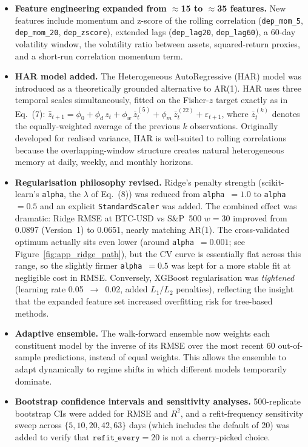\begin{itemize}
    \item \textbf{Feature engineering expanded from $\approx$15 to $\approx$35 features.}
          New features include momentum and z-score of the rolling correlation
          (\texttt{dep\_mom\_5}, \texttt{dep\_mom\_20}, \texttt{dep\_zscore}),
          extended lags (\texttt{dep\_lag20}, \texttt{dep\_lag60}), a 60-day volatility
          window, the volatility ratio between assets, squared-return proxies, and a
          short-run correlation momentum term.
    \item \textbf{HAR model added.}
          The Heterogeneous AutoRegressive (HAR) model
          \cite{corsi2009har}
          was introduced as a theoretically grounded alternative to AR(1).
          HAR uses three temporal scales simultaneously, fitted on the Fisher-$z$
          target exactly as in Eq.~(7):
          $\hat{z}_{t+1} = \phi_0 + \phi_d\,z_t + \phi_w\,\bar{z}^{(5)}_t + \phi_m\,\bar{z}^{(22)}_t + \varepsilon_{t+1}$,
          where $\bar{z}^{(k)}_t$ denotes the equally-weighted average of the previous
          $k$ observations.
          Originally developed for realised variance, HAR is well-suited to rolling
          correlations because the overlapping-window structure creates natural
          heterogeneous memory at daily, weekly, and monthly horizons.
    \item \textbf{Regularisation philosophy revised.}
          Ridge's penalty strength (scikit-learn's \texttt{alpha}, the $\lambda$ of
          Eq.~(8)) was reduced from \texttt{alpha}~$= 1.0$ to \texttt{alpha}~$= 0.5$
          and an explicit \texttt{StandardScaler} was added.
          The combined effect was dramatic: Ridge RMSE at BTC-USD vs S\&P~500 $w = 30$
          improved from 0.0897 (Version~1) to 0.0651, nearly matching AR(1).
          The cross-validated optimum actually sits even lower (around
          \texttt{alpha}~$= 0.001$; see Figure~\ref{fig:app_ridge_path}), but the CV
          curve is essentially flat across this range, so the slightly firmer
          \texttt{alpha}~$= 0.5$ was kept for a more stable fit at negligible cost in RMSE.
          Conversely, XGBoost regularisation was \emph{tightened} (learning rate
          0.05~$\to$~0.02, added $L_1/L_2$ penalties), reflecting the insight that
          the expanded feature set increased overfitting risk for tree-based methods.
    \item \textbf{Adaptive ensemble.}
          The walk-forward ensemble now weights each constituent model by the inverse of
          its RMSE over the most recent 60 out-of-sample predictions, instead of
          equal weights.
          This allows the ensemble to adapt dynamically to regime shifts in which
          different models temporarily dominate.
    \item \textbf{Bootstrap confidence intervals and sensitivity analyses.}
          500-replicate bootstrap CIs were added for RMSE and $R^2$,
          and a refit-frequency sensitivity sweep across
          $\{5, 10, 20, 42, 63\}$ days (which includes the default of 20)
          was added to verify that $\texttt{refit\_every} = 20$ is not a
          cherry-picked choice.
\end{itemize}


